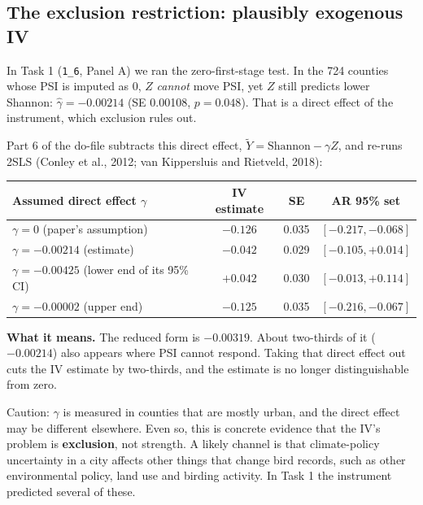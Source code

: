 \documentclass[11pt]{article}
\begin{document}
\subsection{The exclusion restriction: plausibly exogenous IV}
In Task 1 (\texttt{1\_6}, Panel A) we ran the zero-first-stage test. In the 724 counties whose PSI is imputed as 0, $Z$ \emph{cannot} move PSI, yet $Z$ still predicts lower Shannon: $\hat\gamma = -0.00214$ (SE 0.00108, $p=0.048$). That is a direct effect of the instrument, which exclusion rules out.

Part 6 of the do-file subtracts this direct effect, $\tilde Y = \text{Shannon} - \gamma Z$, and re-runs 2SLS (Conley et al., 2012; van Kippersluis and Rietveld, 2018):

\begin{center}
\small
\begin{tabular}{l c c c}
\toprule
Assumed direct effect $\gamma$ & IV estimate & SE & AR 95\% set \\
\midrule
$\gamma=0$ (paper's assumption) & $-0.126$ & 0.035 & $[-0.217, -0.068]$ \\
$\gamma=-0.00214$ (estimate) & $-0.042$ & 0.029 & $[-0.105, +0.014]$ \\
$\gamma=-0.00425$ (lower end of its 95\% CI) & $+0.042$ & 0.030 & $[-0.013, +0.114]$ \\
$\gamma=-0.00002$ (upper end) & $-0.125$ & 0.035 & $[-0.216, -0.067]$ \\
\bottomrule
\end{tabular}
\end{center}

\textbf{What it means.} The reduced form is $-0.00319$. About two-thirds of it ($-0.00214$) also appears where PSI cannot respond. Taking that direct effect out cuts the IV estimate by two-thirds, and the estimate is no longer distinguishable from zero.

Caution: $\gamma$ is measured in counties that are mostly urban, and the direct effect may be different elsewhere. Even so, this is concrete evidence that the IV's problem is \textbf{exclusion}, not strength. A likely channel is that climate-policy uncertainty in a city affects other things that change bird records, such as other environmental policy, land use and birding activity. In Task 1 the instrument predicted several of these.
\end{document}
